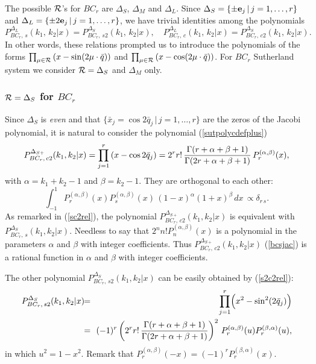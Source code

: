\documentclass[a4paper,12pt]{article}
\begin{document}
The possible ${\cal R}$'s for $BC_r$ are $\Delta_S$, $\Delta_M$ and $\Delta_L$.
Since $\Delta_S=\{\pm{\bf e}_j\,|\,j=1,\ldots,r\}$ and
$\Delta_L=\{\pm2{\bf e}_j\,|\,j=1,\ldots,r\}$, we have trivial identities
among the polynomials
\begin{equation}
   P_{BC_r,\,s}^{\Delta_L}(k_1,\,k_2|x)=P_{BC_r,\,s2}^{\Delta_S}(k_1,\,k_2|x),
   \quad
   P_{BC_r,\,c}^{\Delta_L}(k_1,\,k_2|x)=P_{BC_r,\,c2}^{\Delta_S}(k_1,\,k_2|x).
\end{equation}
In other words, these relations prompted us to introduce the polynomials
of the forms $\prod_{\mu\in{\cal R}}\left(x-\sin(2\mu\cdot\bar{q})\right)$
and $\prod_{\mu\in{\cal R}}\left(x-\cos(2\mu\cdot\bar{q})\right)$.
For $BC_r$ Sutherland system we consider ${\cal R}=\Delta_S$ and $\Delta_M$
only.

\subsubsection{${\cal R}=\Delta_S$ for $BC_r$}

Since $\Delta_S$ is {\em even\/} and that $\{\bar{x}_j=\cos2\bar{q}_j\,|\,
j=1,\ldots,r\}$ are the zeros of the Jacobi polynomial, it is natural to
consider the polynomial (\ref{sutpolycdefplus})
\begin{equation}
   P_{BC_r,\,c2}^{\Delta_{S+}}(k_1,k_2|x)
   =\prod_{j=1}^{r}\left(x-\cos2\bar{q}_j\right)
   =2^rr!\,{\Gamma(r+\alpha+\beta+1)\over{\Gamma(2r+\alpha+\beta+1)}}\,
   P_{r}^{(\alpha,\beta)}(x),
   \label{bcsjac}
\end{equation}
with $\alpha=k_1+k_2-1$ and $\beta=k_2-1$. They are orthogonal to each other:
\begin{equation}
   \int_{-1}^1 P_r^{(\alpha,\beta)}(x)
   P_s^{(\alpha,\beta)}(x)\,(1-x)^\alpha (1+x)^\beta\,dx\,
   \propto\delta_{r\,s}.
\end{equation}
As remarked in (\ref{sc2rel}), the polynomial
$P_{BC_r,\,c2}^{\Delta_{S+}}(k_1,k_2|x)$ %
is equivalent with $P_{BC_r,\,s}^{\Delta_{S}}(k_1,k_2|x)$.
Needless to say that $2^nn!P_n^{(\alpha,\beta)}(x)$ is a
polynomial in the parameters $\alpha$ and $\beta$ with integer coefficients.
Thus $P_{BC_r,\,c2}^{\Delta_{S+}}(k_1,k_2|x)$ (\ref{bcsjac}) is a rational
function in $\alpha$ and $\beta$ with integer coefficients.

The other polynomial $P_{BC_r,\,s2}^{\Delta_{S}}(k_1,k_2|x)$
can be easily obtained by (\ref{s2c2rel}):
\begin{eqnarray}
   P_{BC_r,\,s2}^{\Delta_{S}}(k_1,k_2|x)&\!\!=\!\!&
   \prod_{j=1}^{r}\Bigl(x^2-\sin^2(2\bar{q}_j)\Bigr)
   \nonumber\\
%
   &\!\!=\!\!&(-1)^r\left(2^rr!\,
   {\Gamma(r+\alpha+\beta+1)\over\Gamma(2r+\alpha+\beta+1)}\right)^2\,
   P_{r}^{(\alpha,\beta)}(u)P_{r}^{(\beta,\alpha)}(u),
   \label{bcsjac2}
\end{eqnarray}
in which $u^2=1-x^2$. Remark that $P_{r}^{(\alpha,\beta)}(-x)=
(-1)^rP_{r}^{(\beta,\alpha)}(x)$.
\end{document}

